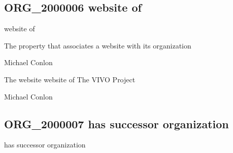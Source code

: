 \documentclass[letterpaper,10pt,english]{sphinxmanual}
\begin{document}
\subsection{ORG\_2000006 \sphinxhyphen{} website of}
\label{\detokenize{doc-ORG_2000006:org-2000006-website-of}}\label{\detokenize{doc-ORG_2000006:index-0}}\label{\detokenize{doc-ORG_2000006::doc}}
\begin{sphinxShadowBox}

\sphinxAtStartPar
website of
\end{sphinxShadowBox}

\begin{sphinxShadowBox}

\sphinxAtStartPar
The property that associates a website with its organization
\end{sphinxShadowBox}

\begin{sphinxShadowBox}

\sphinxAtStartPar
Michael Conlon 
\end{sphinxShadowBox}

\begin{sphinxShadowBox}

\sphinxAtStartPar
The website  website of The VIVO Project
\end{sphinxShadowBox}

\begin{sphinxShadowBox}

\sphinxAtStartPar
Michael Conlon 
\end{sphinxShadowBox}
\begin{quote}

\ignorespaces \end{quote}


\subsection{ORG\_2000007 \sphinxhyphen{} has successor organization}
\label{\detokenize{doc-ORG_2000007:org-2000007-has-successor-organization}}\label{\detokenize{doc-ORG_2000007:index-0}}\label{\detokenize{doc-ORG_2000007::doc}}
\begin{sphinxShadowBox}

\sphinxAtStartPar
has successor organization
\end{sphinxShadowBox}
\end{document}
